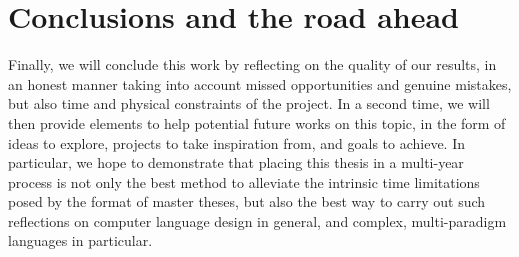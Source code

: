 \section{Conclusions and the road ahead}\label{sec:ch1-4}
Finally, we will conclude this work by reflecting on the quality of our results, in an honest manner taking into account missed opportunities and genuine mistakes, but also time and physical constraints of the project.
In a second time, we will then provide elements to help potential future works on this topic, in the form of ideas to explore, projects to take inspiration from, and goals to achieve.\newline
In particular, we hope to demonstrate that placing this thesis in a multi-year process is not only the best method to alleviate the intrinsic time limitations posed by the format of master theses, but also the best way to carry out such reflections on computer language design in general, and complex, multi-paradigm languages in particular.
